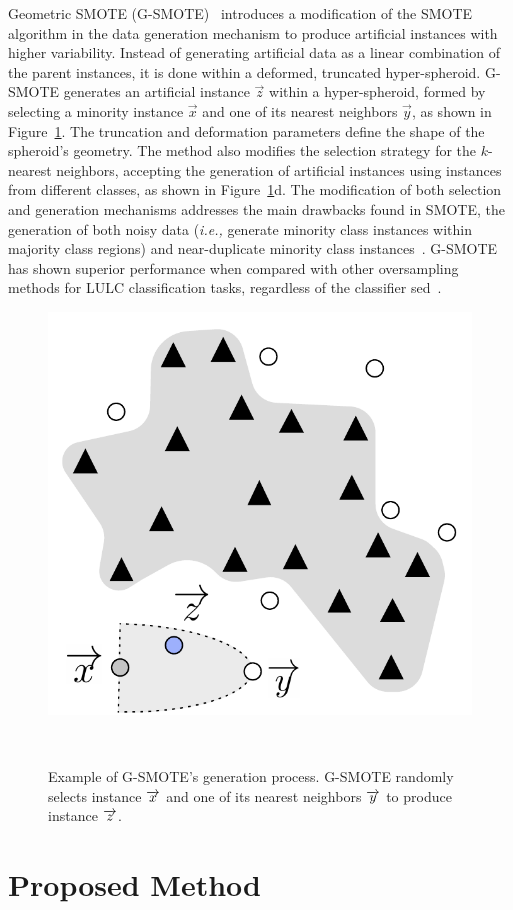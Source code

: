 Geometric SMOTE (G-SMOTE)~\cite{Douzas2019} introduces a modification of the
SMOTE algorithm in the data generation mechanism to produce artificial
instances with higher variability. Instead of generating artificial data as a
linear combination of the parent instances, it is done within a deformed,
truncated hyper-spheroid. G-SMOTE generates an artificial instance
$\overrightarrow{z}$ within a hyper-spheroid, formed by selecting a minority
instance $\overrightarrow{x}$ and one of its nearest neighbors
$\overrightarrow{y}$, as shown in Figure~\ref{fig:data_generation}. The
truncation and deformation parameters define the shape of the spheroid's
geometry. The method also modifies the selection strategy for the $k$-nearest
neighbors, accepting the generation of artificial instances using instances
from different classes, as shown in Figure~\ref{fig:data_generation}d. The
modification of both selection and generation mechanisms addresses the main
drawbacks found in SMOTE, the generation of both noisy data (\textit{i.e.,}
generate minority class instances within majority class regions) and
near-duplicate minority class instances~\cite{Douzas2019}. G-SMOTE has shown
superior performance when compared with other oversampling methods for LULC
classification tasks, regardless of the classifier sed~\cite{Douzas2019rs}.

\begin{figure}
	\centering
	\includegraphics[width=.35\linewidth]{data_generation}
    \caption[Example of G-SMOTE's generation process.]{Example of G-SMOTE's
        generation process. G-SMOTE randomly selects instance
        $\protect\overrightarrow{x}$ and one of its nearest neighbors
        $\protect\overrightarrow{y}$ to produce instance
        $\protect\overrightarrow{z}$.
    }~\label{fig:data_generation}
\end{figure}

\section{Proposed Method}~\label{sec:proposed-method-al-generator}

